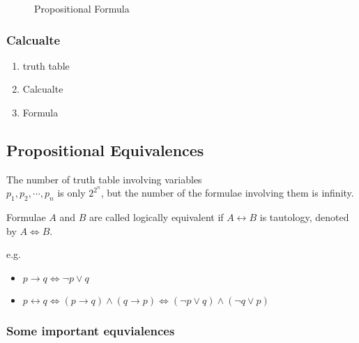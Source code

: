 \begin{figure}[H]
    \centering
    \caption{Propositional Formula}
\end{figure}

\subsubsection{Calcualte}
\begin{enumerate}
    \item truth table
    \item Calcualte
    \item Formula
\end{enumerate}

\subsection{Propositional Equivalences}
The number of truth table involving variables \\ $p_1, p_2, \cdots, p_n$ is only $2^{2^n}$, but the number of the formulae involving them is infinity. 

\begin{definition}
    Formulae $A$ and $B$ are called \textcolor{light_red}{logically equivalent} if $A\longleftrightarrow B$ is tautology, denoted by $A\Longleftrightarrow B$. 
\end{definition}

e.g.
\begin{itemize}
    \item $p\longrightarrow q \Longleftrightarrow \neg p \lor q$
    \item $p\longleftrightarrow q \Longleftrightarrow (p\longrightarrow q)\land (q\longrightarrow p )\Longleftrightarrow (\neg p \lor q)\land (\neg q \lor p)$
\end{itemize}

\subsubsection{Some important equvialences}

